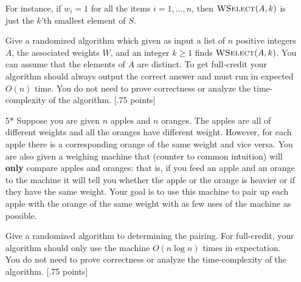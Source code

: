 \documentclass[11pt]{article}
\begin{document}
\begin{enumerate}
For instance, if $w_i = 1$ for all the items $i=1,\ldots,n$, then $\textsc{WSelect}(A,k)$ is just the $k$'th smallest element of $S$. 

Give a randomized algorithm which given as input a list of $n$ positive integers $A$, the associated weights $W$, and an integer $k \geq 1$ finds $\textsc{WSelect}(A,k)$. You can assume that the elements of $A$ are distinct. To get full-credit your algorithm should always output the correct answer and must run in expected $O(n)$ time. You do not need to prove correctness or analyze the time-complexity of the algorithm. [.75 points]

\item[5*] Suppose you are given $n$ apples and $n$ oranges. The apples are all of different weights and all the oranges have different weight. However, for each apple there is a corresponding orange of the same weight and vice versa. You are also given a weighing machine that (counter to common intuition) will {\bf only} compare apples and oranges: that is, if you feed an apple and an orange to the machine it will tell you whether the apple or the orange is heavier or if they have the same weight. Your goal is to use this machine to pair up each apple with the orange of the same weight with as few uses of the machine as possible.

Give a randomized algorithm to determining the pairing. For full-credit, your algorithm should only use the machine $O(n \log n)$ times in expectation. You do not need to prove correctness or analyze the time-complexity of the algorithm. [.75 points]
\end{enumerate}
\end{document}
